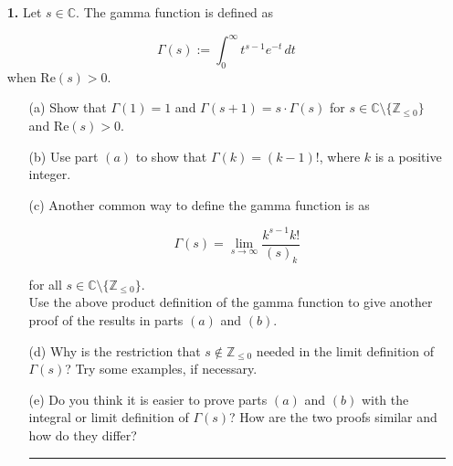 \documentclass[12pt]{amsart}
\theoremstyle{definition}
\theoremstyle{remark}
\numberwithin{equation}{section}
\def\C{\mathbb C}
\def\Z{{\mathbb Z}}
\def\C{\mathbb{C}}
\def\Z{\mathbb{Z}}
\begin{document}
\begin{itemize}

\item[\textbf{1.}] Let $s \in \C$. The gamma function is defined as 

    $$\Gamma(s):= \int_{0}^{\infty} t^{s-1}e^{-t} \, dt$$ when $\text{Re}(s)>0$.
    
    \vspace{4mm}

    \begin{itemize}
        \item[(a)] Show that $\Gamma(1) = 1$ and $\Gamma(s+1) = s \cdot \Gamma(s)$ for $s \in \C \setminus \{\Z_{\leq 0}\}$ and $\text{Re}(s)>0$.

        \vspace{4mm}

        \item[(b)] Use part $(a)$ to show that $\Gamma(k) = (k-1)!$, where $k$ is a positive integer.

        \vspace{4mm}

        \item[(c)] Another common way to define the gamma function is as

        $$\Gamma(s) = \lim_{s \to \infty} \frac{k^{s-1}k!}{(s)_{k}} $$

        for all $s \in \C \setminus \{\Z_{\leq 0}\}.$
        \\

        Use the above product definition of the gamma function to give another proof of the results in parts $(a)$ and $(b)$. 

        \vspace{4mm}

        \item[(d)] Why is the restriction that $s \notin \Z_{\leq 0}$ needed in the limit definition of $\Gamma(s)$? Try some examples, if necessary.

        \vspace{4mm}

        \item[(e)] Do you think it is easier to prove parts $(a)$ and $(b)$ with the integral or limit definition of $\Gamma(s)$? How are the two proofs similar and how do they differ?

        \vspace{4mm}
        
        \hrule{}
    \end{itemize}


\end{itemize}
\end{document}
